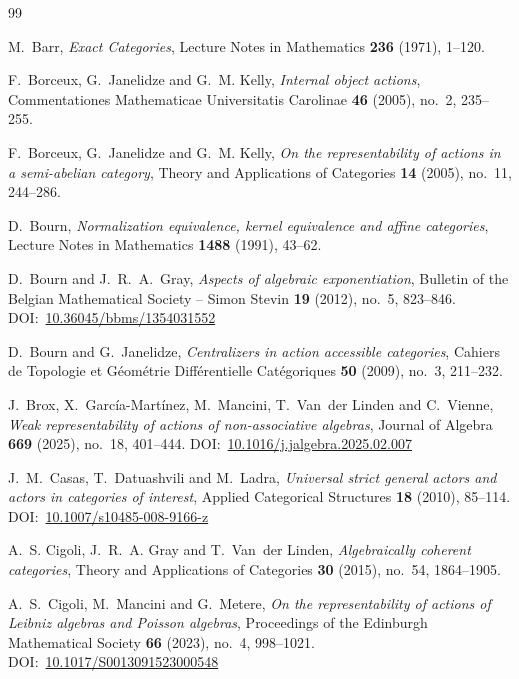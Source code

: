 \documentclass[reqno,hidelinks,a4paper]{amsart}
\renewcommand{\doi}[1]{DOI:~\href{https://doi.org/#1}{#1}}
\theoremstyle{plain}
\theoremstyle{definition}
\theoremstyle{remark}
\numberwithin{equation}{section}
\begin{document}
\begin{thebibliography}{99}

    M.~Barr, \emph{Exact Categories}, Lecture Notes in Mathematics \textbf{236} (1971), 1--120.

    F.~Borceux, G.~Janelidze and G.~M. Kelly, \emph{Internal object actions}, Commentationes Mathematicae Universitatis Carolinae \textbf{46} (2005), no.~2, 235--255.

    F.~Borceux, G.~Janelidze and G.~M. Kelly, \emph{On the representability of actions in a semi-abelian category}, Theory and Applications of Categories \textbf{14} (2005), no.~11, 244--286.

    D.~Bourn, \emph{Normalization equivalence, kernel equivalence and affine categories}, Lecture Notes in Mathematics \textbf{1488} (1991), 43--62.

    D.~Bourn and J.~R.~A.~Gray, \emph{Aspects of algebraic exponentiation}, Bulletin of the Belgian Mathematical Society -- Simon Stevin \textbf{19} (2012), no.~5, 823--846. \doi{10.36045/bbms/1354031552}

    D.~Bourn and G.~Janelidze, \emph{Centralizers in action accessible categories}, Cahiers de Topologie et G\'eom\'etrie Diff\'erentielle Cat\'egoriques \textbf{50} (2009), no.~3, 211--232.

    J.~Brox, X.~García-Martínez, M.~Mancini, T.~Van~der Linden and C.~Vienne, \emph{Weak representability of actions of non-associative algebras}, Journal of Algebra \textbf{669} (2025), no.~18, 401--444. \doi{10.1016/j.jalgebra.2025.02.007}

    J.~M.~Casas, T.~Datuashvili and M.~Ladra, \emph{Universal strict general actors and actors in categories of interest}, Applied Categorical Structures \textbf{18} (2010), 85--114. \doi{10.1007/s10485-008-9166-z}

    A.~S. Cigoli, J.~R.~A. Gray and T.~Van~der Linden, \emph{Algebraically coherent categories}, Theory and Applications of Categories \textbf{30} (2015), no.~54, 1864--1905.

    A.~S.~Cigoli, M.~Mancini and G.~Metere, \emph{On the representability of actions of Leibniz algebras and Poisson algebras}, Proceedings of the Edinburgh Mathematical Society \textbf{66} (2023), no.~4, 998--1021. \doi{10.1017/S0013091523000548}


\end{thebibliography}
\end{document}
